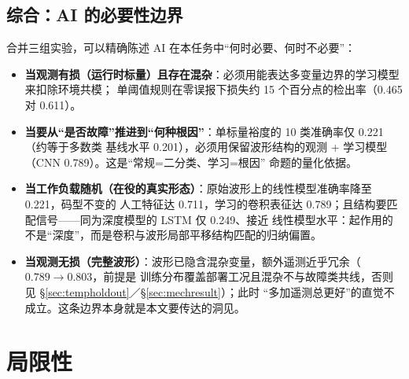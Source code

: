 \documentclass[11pt,a4paper,fontset=mac]{ctexart}
\begin{document}
\subsection{综合：AI 的必要性边界}
合并三组实验，可以精确陈述 AI 在本任务中“何时必要、何时不必要”：
\begin{itemize}
\item \textbf{当观测有损（运行时标量）且存在混杂}：必须用能表达多变量边界的学习模型来扣除环境共模；
单阈值规则在零误报下损失约 15 个百分点的检出率（0.465 对 0.611）。
\item \textbf{当要从“是否故障”推进到“何种根因”}：单标量裕度的 10 类准确率仅 0.221（约等于多数类
基线水平 0.201），必须用保留波形结构的观测 + 学习模型（CNN 0.789）。这是“常规=二分类、学习=根因”
命题的量化依据。
\item \textbf{当工作负载随机（在役的真实形态）}：原始波形上的线性模型准确率降至 0.221，码型不变的
人工特征达 0.711，学习的卷积表征达 0.789；且结构要匹配信号——同为深度模型的 LSTM 仅 0.249、接近
线性模型水平：起作用的不是“深度”，而是卷积与波形局部平移结构匹配的归纳偏置。
\item \textbf{当观测无损（完整波形）}：波形已隐含混杂变量，额外遥测近乎冗余（$0.789\to0.803$，前提是
训练分布覆盖部署工况且混杂不与故障类共线，否则见 \S\ref{sec:tempholdout}／\S\ref{sec:mechresult}）；此时
“多加遥测总更好”的直觉不成立。这条边界本身就是本文要传达的洞见。
\end{itemize}
\section{局限性}
\end{document}

